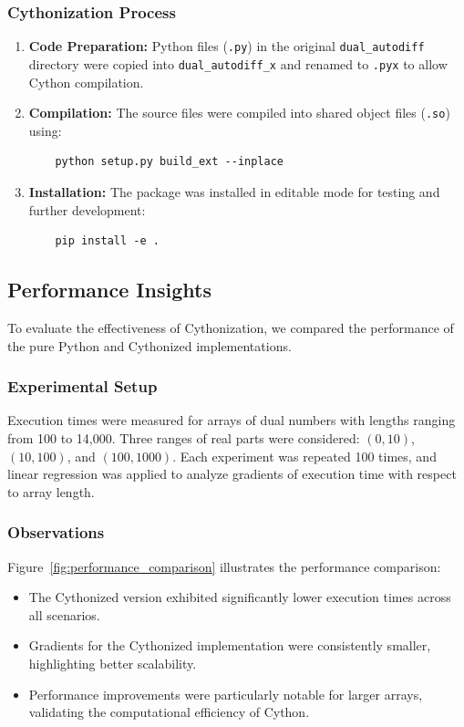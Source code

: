 \documentclass[a4paper,12pt]{article}
\begin{document}
\subsubsection{Cythonization Process}
\begin{enumerate}
    \item \textbf{Code Preparation:} 
    Python files (\texttt{.py}) in the original \texttt{dual\_autodiff} directory were copied into \texttt{dual\_autodiff\_x} and renamed to \texttt{.pyx} to allow Cython compilation.
    
    \item \textbf{Compilation:} 
    The source files were compiled into shared object files (\texttt{.so}) using:
    \begin{verbatim}
    python setup.py build_ext --inplace
    \end{verbatim}
    
    \item \textbf{Installation:} 
    The package was installed in editable mode for testing and further development:
    \begin{verbatim}
    pip install -e .
    \end{verbatim}
\end{enumerate}

\subsection{Performance Insights}
To evaluate the effectiveness of Cythonization, we compared the performance of the pure Python and Cythonized implementations.

\subsubsection{Experimental Setup}
Execution times were measured for arrays of dual numbers with lengths ranging from 100 to 14,000. Three ranges of real parts were considered: \((0,10)\), \((10,100)\), and \((100,1000)\). Each experiment was repeated 100 times, and linear regression was applied to analyze gradients of execution time with respect to array length.

\subsubsection{Observations}
Figure~\ref{fig:performance_comparison} illustrates the performance comparison:
\begin{itemize}
    \item The Cythonized version exhibited significantly lower execution times across all scenarios.
    \item Gradients for the Cythonized implementation were consistently smaller, highlighting better scalability.
    \item Performance improvements were particularly notable for larger arrays, validating the computational efficiency of Cython.
\end{itemize}
\end{document}
